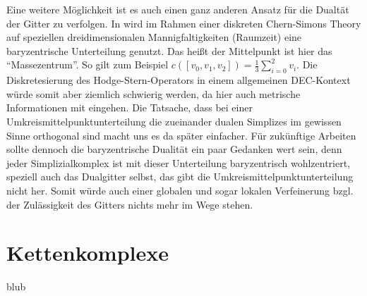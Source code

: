 \begin{fazit}
    Eine weitere Möglichkeit ist es auch einen ganz anderen Ansatz für die Dualtät der Gitter zu verfolgen.
    In \cite{sensen} wird im Rahmen einer diskreten Chern-Simons Theory auf speziellen dreidimensionalen Mannigfaltigkeiten (Raumzeit) eine baryzentrische Unterteilung genutzt.
    Das heißt der Mittelpunkt ist hier das "`Massezentrum"'.
    So gilt zum Beispiel \( c\left( \left[ v_{0},v_{1},v_{2} \right] \right) = \frac{1}{3}\sum_{i=0}^{2}v_{i}\).
    Die Diskretesierung des Hodge-Stern-Operators in einem allgemeinen DEC-Kontext würde somit aber ziemlich schwierig werden, da hier auch metrische Informationen mit eingehen.
    Die Tatsache, dass bei einer Umkreismittelpunktunterteilung die zueinander dualen Simplizes im gewissen Sinne orthogonal sind macht uns es da später einfacher.
    Für zukünftige Arbeiten sollte dennoch die baryzentrische Dualität ein paar Gedanken wert sein, denn jeder Simplizialkomplex ist mit dieser Unterteilung baryzentrisch wohlzentriert,
    speziell auch das Dualgitter selbst, das gibt die Umkreismittelpunktunterteilung nicht her. 
    Somit würde auch einer globalen und sogar lokalen Verfeinerung bzgl. der Zulässigkeit des Gitters nichts mehr im Wege stehen.
  \end{fazit}









\section{Kettenkomplexe}

  \begin{ziel}
    blub  
  \end{ziel}


